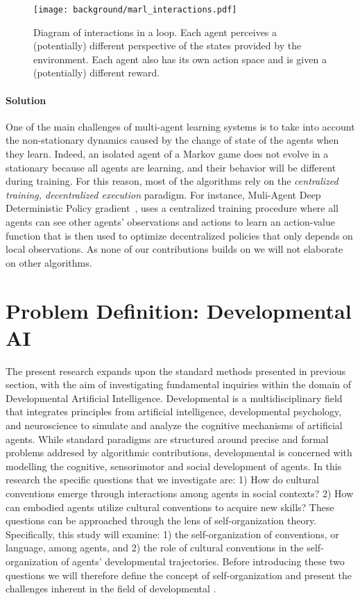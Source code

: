 \begin{figure}[!h]
\centering
\texttt{[image: background/marl\_interactions.pdf]}	
\caption{Diagram of interactions in a \marl loop. Each agent perceives a (potentially) different perspective of the states provided by the environment. Each agent also has its own action space and is given a (potentially) different reward.}
\label{fig:marl_interactions}
\end{figure}

\paragraph{Solution}

One of the main challenges of multi-agent learning systems is to take into account the non-stationary dynamics caused by the change of state of the agents when they learn. Indeed, an isolated agent of a Markov game does not evolve in a stationary \mdp because all agents are learning, and their behavior will be different during training. For this reason, most of the \marl algorithms rely on the \textit{centralized training, decentralized execution} paradigm. For instance, Muli-Agent Deep Deterministic Policy gradient~\citep{lowe2017multi}, uses a centralized training procedure where all agents can see other agents' observations and actions to learn an action-value function that is then used to optimize decentralized policies that only depends on local observations. As none of our contributions builds on \marl we will not elaborate on other \marl algorithms.


\section{Problem Definition: Developmental AI}

The present research expands upon the standard \ai methods presented in previous section, with the aim of investigating fundamental inquiries within the domain of \gls{Developmental Artificial Intelligence}. Developmental \ai is a multidisciplinary field that integrates principles from artificial intelligence, developmental psychology, and neuroscience to simulate and analyze the cognitive mechanisms of artificial agents. While standard \ai paradigms are structured around precise and formal problems addresed by algorithmic contributions, developmental \ai is concerned with modelling the cognitive, sensorimotor and social development of agents. In this research the specific questions that we investigate are: 1) How do cultural conventions emerge through interactions among agents in social contexts? 2) How can embodied agents utilize cultural conventions to acquire new skills? These questions can be approached through the lens of self-organization theory. Specifically, this study will examine: 1) the self-organization of conventions, or language, among agents, and 2) the role of cultural conventions in the self-organization of agents' developmental trajectories. Before introducing these two questions we will therefore define the concept of self-organization and present the challenges inherent in the field of developmental \ai.

